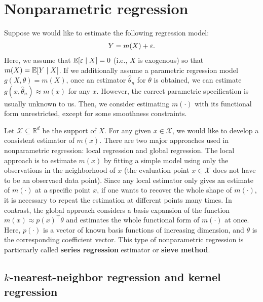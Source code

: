 \documentclass[11pt, A4paper, openany, uplatex]{book}
\begin{document}
\section{Nonparametric regression}

Suppose we would like to estimate the following regression model:
\begin{align}\label{eq:nonpara}
	Y = m(X) + \varepsilon.
\end{align}
Here, we assume that $\mathbb{E}[\varepsilon \mid X] = 0$ (i.e., $X$ is exogenous) so that $m(X) = \mathbb{E}[Y \mid X]$.
If we additionally assume a parametric regression model $g(X, \theta) = m(X)$, once an estimator $\hat \theta_n$ for $\theta$ is obtained, we can estimate $g(x, \hat \theta_n) \approx m(x)$ for any $x$.
However, the correct parametric specification is usually unknown to us.
Then, we consider estimating $m(\cdot)$ with its functional form unrestricted, except for some smoothness constraints.

Let $\mathcal{X} \subseteq \mathbb{R}^d$ be the support of $X$.
For any given $x \in \mathcal{X}$, we would like to develop a consistent estimator of $m(x)$.
There are two major approaches used in nonparametric regression: local regression and global regression.
The local approach is to estimate $m(x)$ by fitting a simple model using only the observations in the neighborhood of $x$ (the evaluation point $x \in \mathcal{X}$ does not have to be an observaed data point).
Since any local estimator only gives an estimate of $m(\cdot)$ at a specific point $x$, if one wants to recover the whole shape of $m(\cdot)$, it is necessary to repeat the estimation at different points many times.
In contrast, the global approach considers a basis expansion of the function $m(x)\approx p(x)^\top \theta$ and estimates the whole functional form of $m(\cdot)$ at once.
Here, $p(\cdot)$ is a vector of known basis functions of increasing dimension, and $\theta$ is the corresponding coefficient vector.
This type of nonparametric regression is particuarly called \textbf{series regression} estimator or \textbf{sieve method}.

\subsection{$k$-nearest-neighbor regression and kernel regression}
\end{document}
